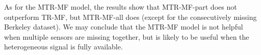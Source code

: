 As for the MTR-MF model, the results show that MTR-MF-part does not outperform TR-MF, but MTR-MF-all does (except for the consecutively missing Berkeley dataset).
We may conclude that the MTR-MF model is not helpful when multiple sensors are missing together, but is likely to be useful when the heterogeneous signal is fully available.

%

